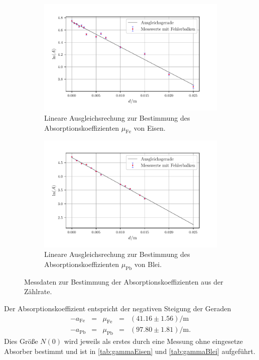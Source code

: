 \begin{figure}[H]
  \begin{subfigure}{\textwidth}
    \centering
    \includegraphics[scale=0.75]{build/plot1.pdf}
    \caption {Lineare Ausgleichsrechung zur Bestimmung des Absorptionskoeffizienten
    $\mu_{\text{Fe}}$ von Eisen.}
    \label{fig:plot1}
  \end{subfigure}
  \hfill
  \begin{subfigure}{\textwidth}
    \centering
    \includegraphics[scale=0.75]{build/plot2.pdf}
    \caption {Lineare Ausgleichsrechung zur Bestimmung des Absorptionskoeffizienten
    $\mu_{\text{Pb}}$ von Blei.}
    \label{fig:plot2}
  \end{subfigure}
    \caption {Messdaten zur Bestimmung der Absorptionskoeffizienten aus der Zählrate.}
  \end{figure}

Der Absorptionskoeffizient entspricht der negativen Steigung der Geraden
\begin{align*}
  -a_{\text{Fe}} &= &\mu_{\text{Fe}} &= & (41.16 \pm 1.56) \si{\per\meter}\\
  -a_{\text{Pb}} &= &\mu_{\text{Pb}} &= & (97.80 \pm 1.81) \si{\per\meter}.
\end{align*}
Dies Größe $N(0)$ wird jeweils als erstes durch eine Messung ohne eingesetze Absorber bestimmt und ist in \autoref{tab:gammaEisen}
und \autoref{tab:gammaBlei} aufgeführt.


